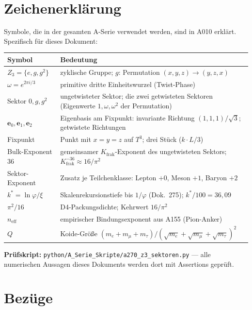 \section{Zeichenerklärung}

Symbole, die in der gesamten A-Serie verwendet werden, sind in A010 erklärt.
Spezifisch für dieses Dokument:

\begin{center}
\renewcommand{\arraystretch}{1.3}
{\small\begin{tabular}{lp{9cm}}
\toprule
Symbol & Bedeutung \\
\midrule
$Z_3=\{e,g,g^2\}$ & zyklische Gruppe; $g$: Permutation $(x,y,z)\to(y,z,x)$ \\
$\omega=e^{2\pi i/3}$ & primitive dritte Einheitswurzel (Twist-Phase) \\
Sektor $0,g,g^2$ & ungetwisteter Sektor; die zwei getwisteten Sektoren (Eigenwerte $1,\omega,\omega^2$ der Permutation) \\
$\mathbf{e}_0,\mathbf{e}_1,\mathbf{e}_2$ & Eigenbasis am Fixpunkt: invariante Richtung $(1,1,1)/\sqrt3$; getwistete Richtungen \\
Fixpunkt & Punkt mit $x=y=z$ auf $T^3$; drei Stück ($k\cdot L/3$) \\
Bulk-Exponent 36 & gemeinsamer $K_\text{frak}$-Exponent des ungetwisteten Sektors; $K_\text{frak}^{-36}\approx 16/\pi^2$ \\
Sektor-Exponent & Zusatz je Teilchenklasse: Lepton $+0$, Meson $+1$, Baryon $+2$ \\
$k^*=\ln\varphi/\xi$ & Skalenrekursionstiefe bis $1/\varphi$ (Dok.~275); $k^*/100=36{,}09$ \\
$\pi^2/16$ & D4-Packungsdichte; Kehrwert $16/\pi^2$ \\
$n_\text{eff}$ & empirischer Bindungsexponent aus A155 (Pion-Anker) \\
$Q$ & Koide-Größe $(m_e{+}m_\mu{+}m_\tau)/(\sqrt{m_e}{+}\sqrt{m_\mu}{+}\sqrt{m_\tau})^2$ \\
\bottomrule
\end{tabular}}
\renewcommand{\arraystretch}{1.0}
\end{center}

\medskip\noindent\textbf{Prüfskript:} \texttt{python/A\_Serie\_Skripte/a270\_z3\_sektoren.py} --- alle numerischen Aussagen dieses Dokuments werden dort mit Assertions geprüft.

\section{Bezüge}

